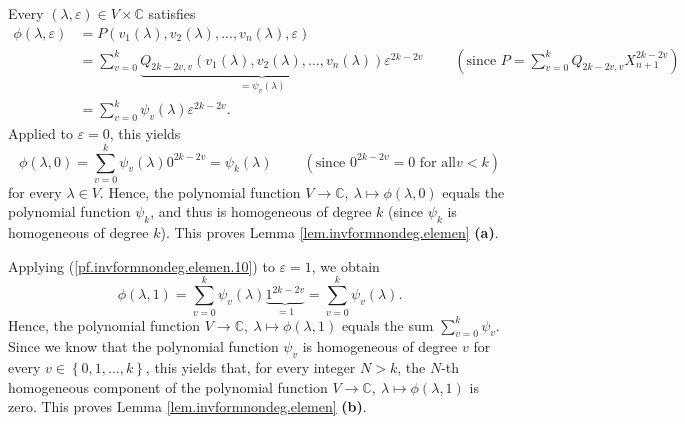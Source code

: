 \documentclass
[numbers=enddot,12pt,final,onecolumn,german,notitlepage]{scrartcl}%
\theoremstyle{definition}
\begin{document}
Every $\left(  \lambda,\varepsilon\right)  \in V\times\mathbb{C}$ satisfies%
\begin{align}
\phi\left(  \lambda,\varepsilon\right)   &  =P\left(  v_{1}\left(
\lambda\right)  ,v_{2}\left(  \lambda\right)  ,...,v_{n}\left(  \lambda
\right)  ,\varepsilon\right) \nonumber\\
&  =\sum\limits_{v=0}^{k}\underbrace{Q_{2k-2v,v}\left(  v_{1}\left(
\lambda\right)  ,v_{2}\left(  \lambda\right)  ,...,v_{n}\left(  \lambda
\right)  \right)  }_{=\psi_{v}\left(  \lambda\right)  }\varepsilon
^{2k-2v}\ \ \ \ \ \ \ \ \ \ \left(  \text{since }P=\sum\limits_{v=0}%
^{k}Q_{2k-2v,v}X_{n+1}^{2k-2v}\right) \nonumber\\
&  =\sum\limits_{v=0}^{k}\psi_{v}\left(  \lambda\right)  \varepsilon^{2k-2v}.
\label{pf.invformnondeg.elemen.10}%
\end{align}
Applied to $\varepsilon=0$, this yields%
\[
\phi\left(  \lambda,0\right)  =\sum\limits_{v=0}^{k}\psi_{v}\left(
\lambda\right)  0^{2k-2v}=\psi_{k}\left(  \lambda\right)
\ \ \ \ \ \ \ \ \ \ \left(  \text{since }0^{2k-2v}=0\text{ for all
}v<k\right)
\]
for every $\lambda\in V$. Hence, the polynomial function $V\rightarrow
\mathbb{C},\ \lambda\mapsto\phi\left(  \lambda,0\right)  $ equals the
polynomial function $\psi_{k}$, and thus is homogeneous of degree $k$ (since
$\psi_{k}$ is homogeneous of degree $k$). This proves Lemma
\ref{lem.invformnondeg.elemen} \textbf{(a)}.

Applying (\ref{pf.invformnondeg.elemen.10}) to $\varepsilon=1$, we obtain%
\[
\phi\left(  \lambda,1\right)  =\sum\limits_{v=0}^{k}\psi_{v}\left(
\lambda\right)  \underbrace{1^{2k-2v}}_{=1}=\sum\limits_{v=0}^{k}\psi
_{v}\left(  \lambda\right)  .
\]
Hence, the polynomial function $V\rightarrow\mathbb{C},\ \lambda\mapsto
\phi\left(  \lambda,1\right)  $ equals the sum $\sum\limits_{v=0}^{k}\psi_{v}%
$. Since we know that the polynomial function $\psi_{v}$ is homogeneous of
degree $v$ for every $v\in\left\{  0,1,...,k\right\}  $, this yields that, for
every integer $N>k$, the $N$-th homogeneous component of the polynomial
function $V\rightarrow\mathbb{C},\ \lambda\mapsto\phi\left(  \lambda,1\right)
$ is zero. This proves Lemma \ref{lem.invformnondeg.elemen} \textbf{(b)}.
\end{document}
